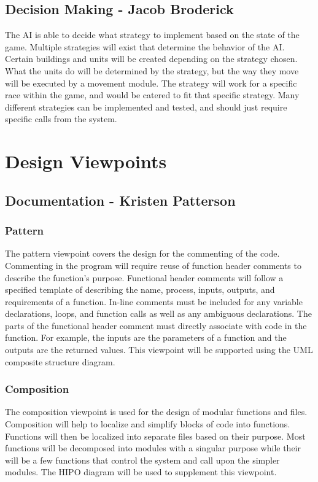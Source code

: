 \documentclass[10pt,letterpaper,onecolumn,draftclsnofoot]{IEEEtran}
\begin{document}
\subsection{Decision Making - Jacob Broderick}
The AI is able to decide what strategy to implement based on the state of the game. Multiple strategies will exist that determine the behavior of the AI. Certain buildings and units will be created depending on the strategy chosen. What the units do will be determined by the strategy, but the way they move will be executed by a movement module. The strategy will work for a specific race within the game, and would be catered to fit that specific strategy. Many different strategies can be implemented and tested, and should just require specific calls from the system.
\section{Design Viewpoints}
\subsection{Documentation - Kristen Patterson}
\subsubsection{Pattern}
	The pattern viewpoint covers the design for the commenting of the code. Commenting in the program will require reuse of function header comments to describe the function's purpose. Functional header comments will follow a specified template of describing the name, process, inputs, outputs, and requirements of a function. In-line comments must be included for any variable declarations, loops, and function calls as well as any ambiguous declarations. The parts of the functional header comment must directly associate with code in the function. For example, the inputs are the parameters of a function and the outputs are the returned values. This viewpoint will be supported using the UML composite structure diagram.
	
\subsubsection{Composition}
	The composition viewpoint is used for the design of modular functions and files. Composition will help to localize and simplify blocks of code into functions. Functions will then be localized into separate files based on their purpose. Most functions will be decomposed into modules with a singular purpose while their will be a few functions that control the system and call upon the simpler modules. The HIPO diagram will be used to supplement this viewpoint.
\end{document}
